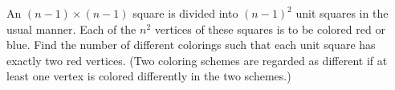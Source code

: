 An $(n-1) \times (n-1)$ square is divided into $(n-1)^2$ unit squares in the usual manner. Each of the $n^2$ vertices of these squares is to be colored red or blue. Find the number of different colorings such that each unit square has exactly two red vertices. (Two coloring schemes are regarded as different if at least one vertex is colored differently in the two schemes.)
